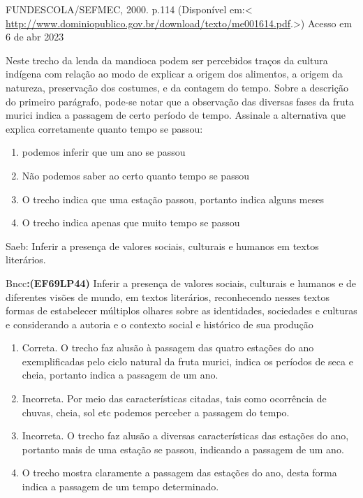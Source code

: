 \begin{description}
\tightlist
\item[Alfabetização : livro do aluno / Ana Rosa Abreu ... {[}et al.{]}
Brasília]
FUNDESCOLA/SEFMEC, 2000. p.114 (Disponível em:\textless{}
\url{http://www.dominiopublico.gov.br/download/texto/me001614.pdf}.\textgreater)
Acesso em 6 de abr 2023
\end{description}

Neste trecho da lenda da mandioca podem ser percebidos traços da cultura
indígena com relação ao modo de explicar a origem dos alimentos, a
origem da natureza, preservação dos costumes, e da contagem do tempo.
Sobre a descrição do primeiro parágrafo, pode-se notar que a observação
das diversas fases da fruta murici indica a passagem de certo período de
tempo. Assinale a alternativa que explica corretamente quanto tempo se
passou:

\begin{enumerate}
\def\labelenumi{\alph{enumi})}
\item
  podemos inferir que um ano se passou
\item
  Não podemos saber ao certo quanto tempo se passou
\item
  O trecho indica que uma estação passou, portanto indica alguns meses
\item
  O trecho indica apenas que muito tempo se passou
\end{enumerate}

Saeb: Inferir a presença de valores sociais, culturais e humanos em
textos literários.

Bncc\textbf{:(EF69LP44)} Inferir a presença de valores sociais,
culturais e humanos e de diferentes visões de mundo, em textos
literários, reconhecendo nesses textos formas de estabelecer múltiplos
olhares sobre as identidades, sociedades e culturas e considerando a
autoria e o contexto social e histórico de sua produção

\begin{enumerate}
\def\labelenumi{\arabic{enumi}.}
\item
  Correta. O trecho faz alusão à passagem das quatro estações do ano
  exemplificadas pelo ciclo natural da fruta murici, indica os períodos
  de seca e cheia, portanto indica a passagem de um ano.
\item
  Incorreta. Por meio das características citadas, tais como ocorrência
  de chuvas, cheia, sol etc podemos perceber a passagem do tempo.
\item
  Incorreta. O trecho faz alusão a diversas características das estações
  do ano, portanto mais de uma estação se passou, indicando a passagem
  de um ano.
\item
  O trecho mostra claramente a passagem das estações do ano, desta forma
  indica a passagem de um tempo determinado.
\end{enumerate}

